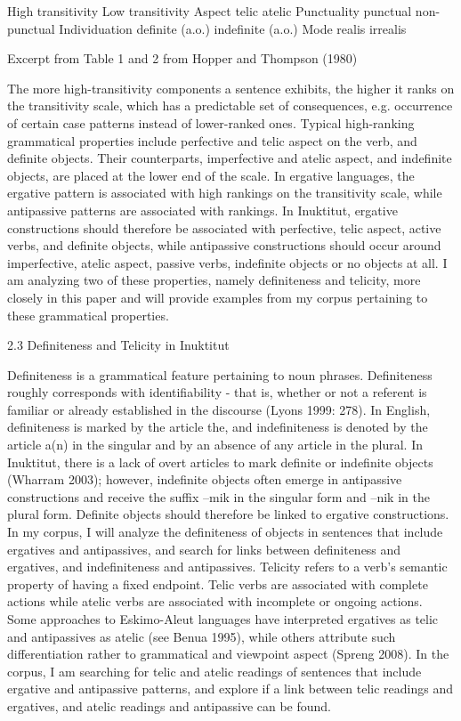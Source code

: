 \documentclass[12pt]{article}
\begin{document}
High transitivity
Low transitivity
Aspect
telic
atelic
Punctuality
punctual
non-punctual
Individuation
definite (a.o.)
indefinite (a.o.)
Mode
realis
irrealis

Excerpt from Table 1 and 2 from Hopper and Thompson (1980)

The more high-transitivity components a sentence exhibits, the higher it ranks on the transitivity scale, which has a predictable set of consequences, e.g. occurrence of certain case patterns instead of lower-ranked ones. Typical high-ranking grammatical properties include perfective and telic aspect on the verb, and definite objects. Their counterparts, imperfective and atelic aspect, and indefinite objects, are placed at the lower end of the scale. 
In ergative languages, the ergative pattern is associated with high rankings on the transitivity scale, while antipassive patterns are associated with rankings. In Inuktitut, ergative constructions should therefore be associated with perfective, telic aspect, active verbs, and definite objects, while antipassive constructions should occur around imperfective, atelic aspect, passive verbs, indefinite objects or no objects at all. I am analyzing two of these properties, namely definiteness and telicity, more closely in this paper and will provide examples from my corpus pertaining to these grammatical properties. 

2.3 Definiteness and Telicity in Inuktitut

Definiteness is a grammatical feature pertaining to noun phrases. Definiteness roughly corresponds with identifiability - that is, whether or not a referent is familiar or already established in the discourse (Lyons 1999: 278).  In English, definiteness is marked by the article the, and indefiniteness is denoted by the article a(n) in the singular and by an absence of any article in the plural. In Inuktitut, there is a lack of overt articles to mark definite or indefinite objects (Wharram 2003); however, indefinite objects often emerge in antipassive constructions and receive the suffix –mik in the singular form and –nik in the plural form. Definite objects should therefore be linked to ergative constructions. In my corpus, I will analyze the definiteness of objects in sentences that include ergatives and antipassives, and search for links between definiteness and ergatives, and indefiniteness and antipassives.
Telicity refers to a verb’s semantic property of having a fixed endpoint. Telic verbs are associated with complete actions while atelic verbs are associated with incomplete or ongoing actions. Some approaches to Eskimo-Aleut languages have interpreted ergatives as telic and antipassives as atelic (see Benua 1995), while others attribute such differentiation rather to grammatical and viewpoint aspect (Spreng 2008). In the corpus, I am searching for telic and atelic readings of sentences that include ergative and antipassive patterns, and explore if a link between telic readings and ergatives, and atelic readings and antipassive can be found.
\end{document}
